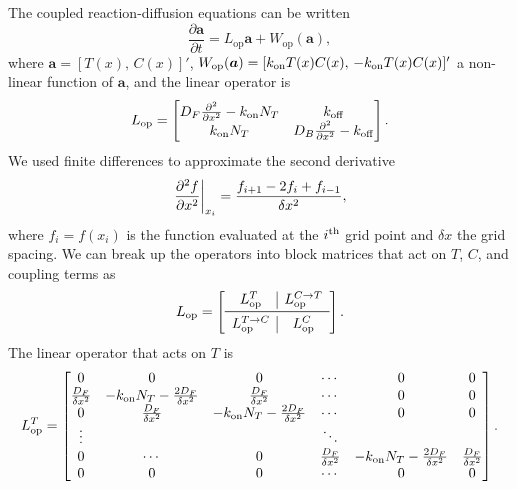 The coupled reaction-diffusion equations can be written
%
\begin{equation}
\frac{\partial \bm{a}}{\partial t} = L_{\text{op}} \bm{a} 
+ W_{\text{op}}(\bm{a}),
\end{equation}
%
where $\bm{a} = [T(x), \, C(x)]'$, $W_{\text{op}}(\bm{a}) = [k_{\rm on} T(x) C(x), \,
-k_{\rm on} T(x) C(x)]'$ a non-linear function of $\bm{a}$, and the linear operator
is
% 
\begin{equation}
L_{\text{op}} = 
  \begin{bmatrix}
    D_F\frac{\partial^2 }{\partial x ^2}-k_{\rm on} N_T & k_{\rm off} \\
    k_{\rm on} N_T & D_B\frac{\partial^2 }{\partial x ^2}-k_{\rm off} \\
  \end{bmatrix}.
\end{equation}
%
We used finite differences to approximate the second derivative
%
\begin{equation}
  \left. \frac{\partial^2 f}{\partial x ^2}\right|_{x_i} = \frac{f_{i+1} - 2f_{i} + f_{i-1}}{\delta x^2},
\end{equation}
%
where $f_i=f(x_i)$ is the function evaluated at the $i^{\mathrm{th}}$ grid point and
$\delta x$ the grid spacing.  We can break up the operators into block
matrices that act on $T$, $C$, and coupling terms as
%
\begin{equation}
L_{\tx{op}} =
\left[
\begin{array}{c c c}
  L^{T}_{\tx{op}}  & \rvline &  L^{C\rightarrow T}_{\tx{op}}\\
\midrule
L^{T\rightarrow C}_{\tx{op}}  & \rvline & L^{C}_{\tx{op}}
\end{array}
\right].
\end{equation}
%
The linear operator that acts on $T$ is
%
\begin{equation}
L^{T}_{\mathrm{op}} =
\begin{bmatrix}
  0 & 0 & 0 & \cdots & 0 & 0 \\
  \frac{D_F}{\delta x^2} & -k_{\rm on} N_T -\frac{2 D_F}{\delta x^2} &
  \frac{D_F}{\delta x^2} & \cdots & 0 & 0\\
  0 & \frac{D_F}{\delta x^2} & -k_{\rm on} N_T -\frac{2 D_F}{\delta x^2} &  \cdots & 0 & 0\\
  \vdots & & &\ddots \\
  0 & \cdots & 0 &\frac{D_F}{\delta x^2} & -k_{\rm on} N_T -\frac{2 D_F}{\delta x^2}  & \frac{D_F}{\delta x^2}\\
  0 & 0 & 0 & \cdots & 0 & 0 \\
\end{bmatrix}.
\end{equation}
